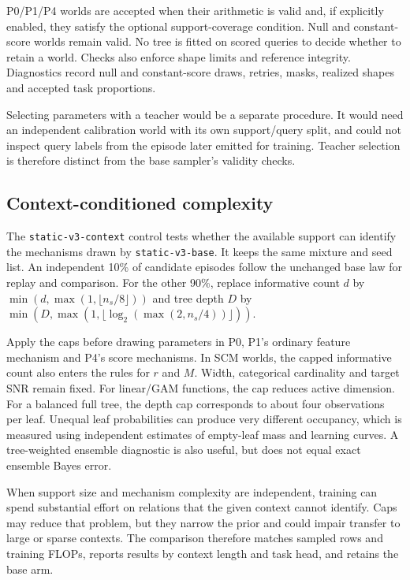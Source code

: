 \documentclass[11pt]{article}
\begin{document}
P0/P1/P4 worlds are accepted when their arithmetic is valid and, if explicitly enabled, they satisfy the optional support-coverage condition. Null and constant-score worlds remain valid. No tree is fitted on scored queries to decide whether to retain a world. Checks also enforce shape limits and reference integrity. Diagnostics record null and constant-score draws, retries, masks, realized shapes and accepted task proportions.

Selecting parameters with a teacher would be a separate procedure. It would need an independent calibration world with its own support/query split, and could not inspect query labels from the episode later emitted for training. Teacher selection is therefore distinct from the base sampler's validity checks.

\subsection{Context-conditioned complexity}

The \texttt{static-v3-context} control tests whether the available support can identify the mechanisms drawn by \texttt{static-v3-base}. It keeps the same mixture and seed list. An independent 10\% of candidate episodes follow the unchanged base law for replay and comparison. For the other 90\%, replace informative count $d$ by $\min(d,\max(1,\lfloor n_s/8\rfloor))$ and tree depth $D$ by $\min(D,\max(1,\lfloor\log_2(\max(2,n_s/4))\rfloor))$.

Apply the caps before drawing parameters in P0, P1's ordinary feature mechanism and P4's score mechanisms. In SCM worlds, the capped informative count also enters the rules for $r$ and $M$. Width, categorical cardinality and target SNR remain fixed. For linear/GAM functions, the cap reduces active dimension. For a balanced full tree, the depth cap corresponds to about four observations per leaf. Unequal leaf probabilities can produce very different occupancy, which is measured using independent estimates of empty-leaf mass and learning curves. A tree-weighted ensemble diagnostic is also useful, but does not equal exact ensemble Bayes error.

When support size and mechanism complexity are independent, training can spend substantial effort on relations that the given context cannot identify. Caps may reduce that problem, but they narrow the prior and could impair transfer to large or sparse contexts. The comparison therefore matches sampled rows and training FLOPs, reports results by context length and task head, and retains the base arm.
\end{document}
